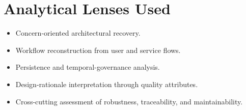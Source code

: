 \documentclass[11pt,a4paper]{article}
\begin{document}
\section{Analytical Lenses Used}
\begin{itemize}
  \item Concern-oriented architectural recovery.
  \item Workflow reconstruction from user and service flows.
  \item Persistence and temporal-governance analysis.
  \item Design-rationale interpretation through quality attributes.
  \item Cross-cutting assessment of robustness, traceability, and maintainability.
\end{itemize}
\end{document}
